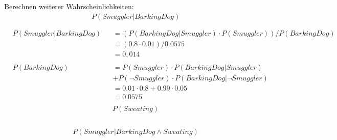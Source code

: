 \documentclass[ngerman]{fbi-aufgabenblatt}
\begin{document}
Berechnen weiterer Wahrscheinlichkeiten:
\begin{align*}
&P(Smuggler | BarkingDog)\\
&\\
\end{align*}
\begin{align*}
&P(Smuggler | BarkingDog) &&= (P(BarkingDog | Smuggler) \cdot P(Smuggler)) / P(BarkingDog) \\
& &&= (0.8 \cdot 0.01) / 0.0575\\
& &&= 0,014\\
&\\
&P(BarkingDog) &&= P(Smuggler) \cdot P(BarkingDog | Smuggler) \\
& &&   + P( \neg Smuggler) \cdot P(BarkingDog | \neg Smuggler) \\
& &&= 0.01 \cdot 0.8 + 0.99 \cdot 0.05 \\
& &&= 0.0575 \\
\end{align*}
\begin{align*}
&P(Sweating)\\
&\\
\end{align*}
\begin{align*}
&\\
\end{align*}
\begin{align*}
&P(Smuggler | BarkingDog \land Sweating)\\
&\\
\end{align*}
\end{document}
